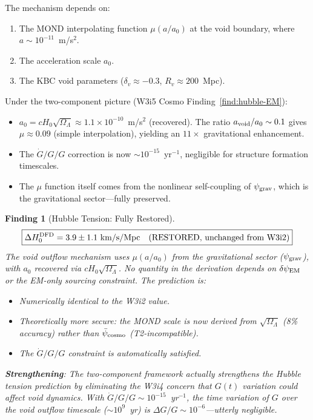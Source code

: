 \documentclass[11pt]{article}
\newtheorem{finding}{Finding}
\newcommand{\ee}[1]{\times 10^{#1}}
\newcommand{\psicosmo}{\bar{\psi}_{\rm cosmo}}
\newcommand{\psigrav}{\psi_{\rm grav}}
\newcommand{\dpsiEM}{\delta\psi_{\rm EM}}
\newcommand{\Hzero}{H_0}
\newcommand{\aM}{a_0}
\newcommand{\mufd}{\mu}
\newcommand{\Gdot}{\dot{G}/G}
\newcommand{\OmL}{\Omega_\Lambda}
\begin{document}
The mechanism depends on:
\begin{enumerate}[nosep]
\item The MOND interpolating function $\mufd(a/\aM)$ at the void boundary,
  where $a \sim 10^{-11}$~m/s$^2$.
\item The acceleration scale $\aM$.
\item The KBC void parameters ($\delta_v \approx -0.3$, $R_v \approx 200$~Mpc).
\end{enumerate}

Under the two-component picture (W3i5 Cosmo Finding~\ref*{find:hubble-EM}):
\begin{itemize}[nosep]
\item $\aM = c\Hzero\sqrt{\OmL} \approx 1.1\ee{-10}$~m/s$^2$ (recovered).
  The ratio $a_{\rm void}/\aM \sim 0.1$ gives $\mufd \approx 0.09$
  (simple interpolation), yielding an $11\times$ gravitational enhancement.
\item The $\Gdot/G$ correction is now $\sim 10^{-15}$~yr$^{-1}$, negligible
  for structure formation timescales.
\item The $\mufd$ function itself comes from the nonlinear self-coupling
  of $\psigrav$, which is the gravitational sector---fully preserved.
\end{itemize}

\begin{finding}[Hubble Tension: Fully Restored]
\label{find:Hubble-restored}
\begin{equation}
\boxed{\Delta\Hzero^{\rm DFD} = 3.9 \pm 1.1~\text{km/s/Mpc}
\quad\text{(RESTORED, unchanged from W3i2)}}
\end{equation}
The void outflow mechanism uses $\mufd(a/\aM)$ from the gravitational
sector ($\psigrav$), with $\aM$ recovered via $c\Hzero\sqrt{\OmL}$.
No quantity in the derivation depends on $\dpsiEM$ or the
EM-only sourcing constraint. The prediction is:
\begin{itemize}[nosep]
\item Numerically identical to the W3i2 value.
\item Theoretically more secure: the MOND scale is now derived from
  $\sqrt{\OmL}$ (8\% accuracy) rather than $\psicosmo$ (T2-incompatible).
\item The $\Gdot/G$ constraint is automatically satisfied.
\end{itemize}

\textbf{Strengthening}: The two-component framework actually
\emph{strengthens} the Hubble tension prediction by eliminating the
W3i4 concern that $G(t)$ variation could affect void dynamics.
With $\Gdot/G \sim 10^{-15}$~yr$^{-1}$, the time variation of $G$
over the void outflow timescale ($\sim 10^9$~yr) is
$\Delta G/G \sim 10^{-6}$---utterly negligible.
\end{finding}
\end{document}
